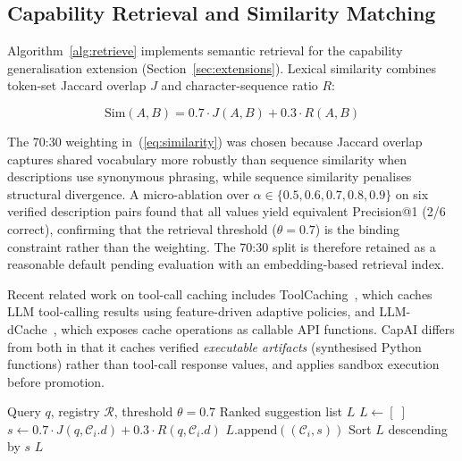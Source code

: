 \documentclass[conference]{IEEEtran}
\begin{document}
\subsection{Capability Retrieval and Similarity Matching}
\label{subsec:retrieval}

Algorithm~\ref{alg:retrieve} implements semantic retrieval for the
capability generalisation extension (Section~\ref{sec:extensions}).
Lexical similarity combines token-set Jaccard overlap $J$ and
character-sequence ratio $R$:

\begin{equation}
\text{Sim}(A, B) = 0.7 \cdot J(A, B) + 0.3 \cdot R(A, B)
\label{eq:similarity}
\end{equation}

The 70:30 weighting in~(\ref{eq:similarity}) was chosen because Jaccard
overlap captures shared vocabulary more robustly than sequence similarity
when descriptions use synonymous phrasing, while sequence similarity
penalises structural divergence.
A micro-ablation over $\alpha \in \{0.5, 0.6, 0.7, 0.8, 0.9\}$ on six
verified description pairs found that all values yield equivalent
Precision@1 (2/6 correct), confirming that the retrieval threshold
($\theta = 0.7$) is the binding constraint rather than the weighting.
The 70:30 split is therefore retained as a reasonable default pending
evaluation with an embedding-based retrieval index.

Recent related work on tool-call caching includes ToolCaching~\cite{zhai2025toolcaching},
which caches LLM tool-calling results using feature-driven adaptive
policies, and LLM-dCache~\cite{stamoulis2024llmdcache}, which exposes
cache operations as callable API functions.
CapAI differs from both in that it caches verified \emph{executable
artifacts} (synthesised Python functions) rather than tool-call response
values, and applies sandbox execution before promotion.

\begin{algorithm}
\caption{Capability Retrieval and Suggestion}
\label{alg:retrieve}
\begin{algorithmic}[1]
\REQUIRE Query $q$, registry $\mathcal{R}$, threshold $\theta = 0.7$
\ENSURE Ranked suggestion list $L$
\STATE $L \leftarrow [\;]$
  \STATE $s \leftarrow 0.7 \cdot J(q, \mathcal{C}_i.d)
         + 0.3 \cdot R(q, \mathcal{C}_i.d)$
    \STATE $L.\text{append}((\mathcal{C}_i, s))$
  \ENDIF
\ENDFOR
\STATE Sort $L$ descending by $s$
\RETURN $L$ \hfill{}
\end{algorithmic}
\end{algorithm}
\end{document}
